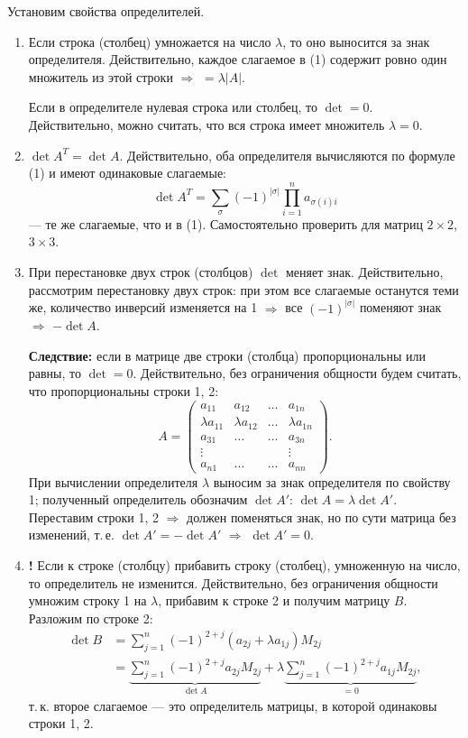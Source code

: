 \documentclass[a4paper, 12pt]{article}
\begin{document}
Установим свойства определителей.
\begin{enumerate}[label=\arabic*)]
  \item Если строка (столбец) умножается на число $\lambda$, то оно выносится
    за знак определителя. Действительно, каждое слагаемое в (1) содержит
    ровно один множитель из этой строки $\Rightarrow$ $= \lambda |A|$.

    Если в определителе нулевая строка или столбец, то $\det = 0$.
    Действительно, можно считать, что вся строка имеет множитель
    $\lambda = 0$.
  \item $\det A^T = \det A$. Действительно, оба определителя вычисляются
    по формуле (1) и имеют одинаковые слагаемые:
    \[
      \det A^T = \sum_{\sigma} (-1)^{|\sigma|} \prod_{i=1}^{n} a_{\sigma(i) i}
    \]
    --- те же слагаемые, что и в (1). Самостоятельно проверить для матриц
    $2 \times 2$, $3 \times 3$.
  \item При перестановке двух строк (столбцов) $\det$ меняет знак.
    Действительно, рассмотрим перестановку двух строк: при этом все слагаемые
    останутся теми же, количество инверсий изменяется на 1 $\Rightarrow$
    все $(-1)^{|\sigma|}$ поменяют знак $\Rightarrow$ $-\det A$.

    \textbf{Следствие:} если в матрице две строки (столбца) пропорциональны
    или равны, то $\det = 0$. Действительно, без ограничения общности будем
    считать, что пропорциональны строки 1, 2:
    \[
      A = \begin{pmatrix}
        a_{11} & a_{12} & \dots & a_{1n} \\
        \lambda a_{11} & \lambda a_{12} & \dots & \lambda a_{1n} \\
        a_{31} & \dots & \dots & a_{3n} \\
        \vdots & & & \vdots \\
        a_{n1} & \dots & \dots & a_{nn}
      \end{pmatrix}.
    \]
    При вычислении определителя $\lambda$ выносим за знак определителя по
    свойству 1; полученный определитель обозначим $\det A'$:
    $\det A = \lambda \det A'$. Переставим строки 1, 2 $\Rightarrow$ должен
    поменяться знак, но по сути матрица без изменений, т.\,е.
    $\det A' = -\det A'$ $\Rightarrow$ $\det A' = 0$.
  \item \textbf{!} Если к строке (столбцу) прибавить строку (столбец),
    умноженную на число, то определитель не изменится. Действительно, без
    ограничения общности умножим строку 1 на $\lambda$, прибавим к строке 2
    и получим матрицу $B$. Разложим по строке 2:
    \begin{align*}
      \det B &= \sum_{j=1}^{n} (-1)^{2+j} (a_{2j} + \lambda a_{1j}) M_{2j} \\
      &= \underbrace{\sum_{j=1}^{n} (-1)^{2+j} a_{2j} M_{2j}}_{\det A}
      + \lambda \underbrace{\sum_{j=1}^{n} (-1)^{2+j} a_{1j} M_{2j}}_{= 0},
    \end{align*}
    т.\,к. второе слагаемое --- это определитель матрицы, в которой одинаковы
    строки 1, 2.
\end{enumerate}
\end{document}
